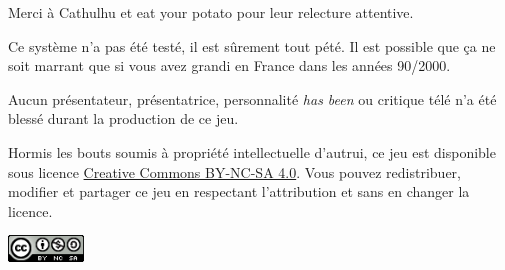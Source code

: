 \documentclass[french,twocolumn,twoside]{article}
\begin{document}
{Merci à Cathulhu et eat your potato pour leur relecture attentive.

Ce système n'a pas été testé, il est sûrement tout pété. Il est possible que ça ne soit marrant que si vous avez grandi en France dans les années 90/2000.

Aucun présentateur, présentatrice, personnalité \textit{has been} ou critique télé n'a été blessé durant la production de ce jeu.

Hormis les bouts soumis à propriété intellectuelle d'autrui, ce jeu est disponible sous licence \href{https://creativecommons.org/licenses/by-nc-sa/4.0/}{Creative Commons BY-NC-SA 4.0}. Vous pouvez redistribuer, modifier et partager ce jeu en respectant l'attribution et sans en changer la licence.

\begin{center}
\includegraphics[width=0.15\textwidth]{licence}
\end{center}
}
\end{document}
